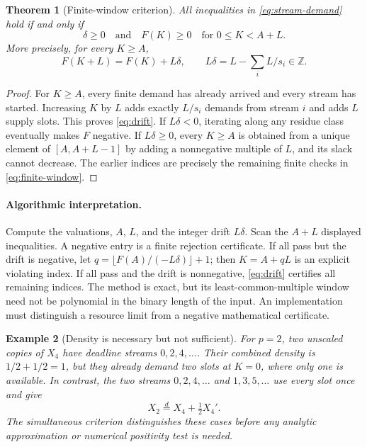 \documentclass[11pt,a4paper]{article}
\newtheorem{theorem}{Theorem}[section]
\newtheorem{example}[theorem]{Example}
\theoremstyle{remark}
\newcommand{\Z}{\mathbb Z}
\newcommand{\eqd}{\overset{d}{=}}
\begin{document}
\begin{theorem}[Finite-window criterion]
\label{thm:finite-window}
All inequalities in \eqref{eq:stream-demand} hold if and only if
\begin{equation}
 \delta\ge0\quad\text{and}\quad
 F(K)\ge0\quad\text{for }0\le K<A+L.
 \label{eq:finite-window}
\end{equation}
More precisely, for every $K\ge A$,
\begin{equation}
 F(K+L)=F(K)+L\delta,
 \qquad L\delta=L-\sum_iL/s_i\in\Z.
 \label{eq:drift}
\end{equation}
\end{theorem}
\begin{proof}
For $K\ge A$, every finite demand has already arrived and every stream has
started. Increasing $K$ by $L$ adds exactly $L/s_i$ demands from stream $i$ and
adds $L$ supply slots. This proves \eqref{eq:drift}. If $L\delta<0$, iterating
along any residue class eventually makes $F$ negative. If $L\delta\ge0$,
every $K\ge A$ is obtained from a unique element of $[A,A+L-1]$ by adding a
nonnegative multiple of $L$, and its slack cannot decrease. The earlier
indices are precisely the remaining finite checks in \eqref{eq:finite-window}.
\end{proof}

\paragraph{Algorithmic interpretation.}
Compute the valuations, $A$, $L$, and the integer drift $L\delta$. Scan the
$A+L$ displayed inequalities. A negative entry is a finite rejection
certificate. If all pass but the drift is negative, let
$q=\lfloor F(A)/(-L\delta)\rfloor+1$; then $K=A+qL$ is an explicit violating
index. If all pass and the drift is nonnegative, \eqref{eq:drift} certifies
all remaining indices. The method is exact, but its least-common-multiple
window need not be polynomial in the binary length of the input. An implementation
must distinguish a resource limit from a negative mathematical certificate.

\begin{example}[Density is necessary but not sufficient]
For $p=2$, two unscaled copies of $X_4$ have deadline streams $0,2,4,\ldots$.
Their combined density is $1/2+1/2=1$, but they already demand two slots at
$K=0$, where only one is available. In contrast, the two streams
$0,2,4,\ldots$ and $1,3,5,\ldots$ use every slot once and give
\[
 X_2\eqd X_4+\tfrac12X_4'.
\]
The simultaneous criterion distinguishes these cases before any analytic
approximation or numerical positivity test is needed.
\end{example}
\end{document}
